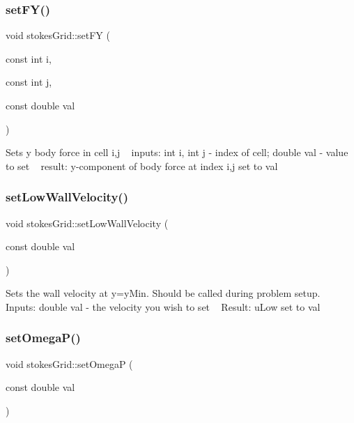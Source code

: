 \subsubsection{\texorpdfstring{set\+F\+Y()}{setFY()}}
{\footnotesize\ttfamily void stokes\+Grid\+::set\+FY (\begin{DoxyParamCaption}\item[{const int}]{i,  }\item[{const int}]{j,  }\item[{const double}]{val }\end{DoxyParamCaption})}

Sets y body force in cell i,j ~\newline
inputs\+: int i, int j -\/ index of cell; double val -\/ value to set ~\newline
result\+: y-\/component of body force at index i,j set to val \mbox{\label{classstokesGrid_a50893f188b7614e0833405ba913584bf}} 
\subsubsection{\texorpdfstring{set\+Low\+Wall\+Velocity()}{setLowWallVelocity()}}
{\footnotesize\ttfamily void stokes\+Grid\+::set\+Low\+Wall\+Velocity (\begin{DoxyParamCaption}\item[{const double}]{val }\end{DoxyParamCaption})}

Sets the wall velocity at y=y\+Min. Should be called during problem setup. ~\newline
 Inputs\+: double val -\/ the velocity you wish to set ~\newline
Result\+: u\+Low set to val \mbox{\label{classstokesGrid_af7696163e6000dec6d0a94db68a81aad}} 
\subsubsection{\texorpdfstring{set\+Omega\+P()}{setOmegaP()}}
{\footnotesize\ttfamily void stokes\+Grid\+::set\+OmegaP (\begin{DoxyParamCaption}\item[{const double}]{val }\end{DoxyParamCaption})}

